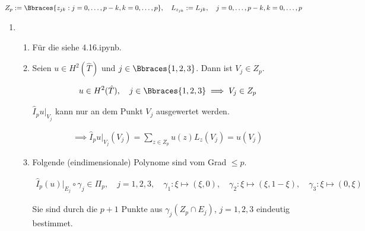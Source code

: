
\begin{solution}

\begin{align*}
  Z_p
  :=
  \Bbraces{z_{jk}: j = 0, \dots, p - k, k = 0, \dots, p},
  \quad
  L_{z_{jk}}
  :=
  L_{jk},
  \quad
  j = 0, \dots, p - k, k = 0, \dots, p
\end{align*}

\begin{enumerate}[label = \textbf{\alph*)}]

  \item
  
  \begin{enumerate}[label = (\roman*)]

    \item Für die  siehe 4.16.ipynb.

    \item Seien $u \in H^2(\hat T)$ und $j \in \Bbraces{1, 2, 3}$.
    Dann ist $V_j \in Z_p$.
  
    \begin{align*}
      u \in H^2(\hat T),
      \quad
      j \in \Bbraces{1, 2, 3}
      \implies
      V_j \in Z_p
    \end{align*}
  
    $\hat I_p u|_{V_j}$ kann nur an dem Punkt $V_j$ ausgewertet werden.
  
    \begin{align*}
      \implies
      \hat I_p u|_{V_j}(V_j)
      =
      \sum_{z \in Z_p}
      u(z) L_z(V_j)
      =
      u(V_j)
    \end{align*}

    \item Folgende (eindimensionale) Polynome sind vom Grad $\leq p$.
    
    \begin{align*}
      \hat I_p(u)|_{E_j} \circ \gamma_j \in \Pi_p,
      \quad
      j = 1, 2, 3,
      \quad
      \gamma_1: \xi \mapsto (\xi, 0),
      \quad
      \gamma_2: \xi \mapsto (\xi, 1 - \xi),
      \quad
      \gamma_3: \xi \mapsto (0, \xi)
    \end{align*}

    Sie sind durch die $p + 1$ Punkte aus $\gamma_j(Z_p \cap E_j)$, $j = 1, 2, 3$ eindeutig bestimmet.

  \end{enumerate}


\end{enumerate}
\end{solution}
